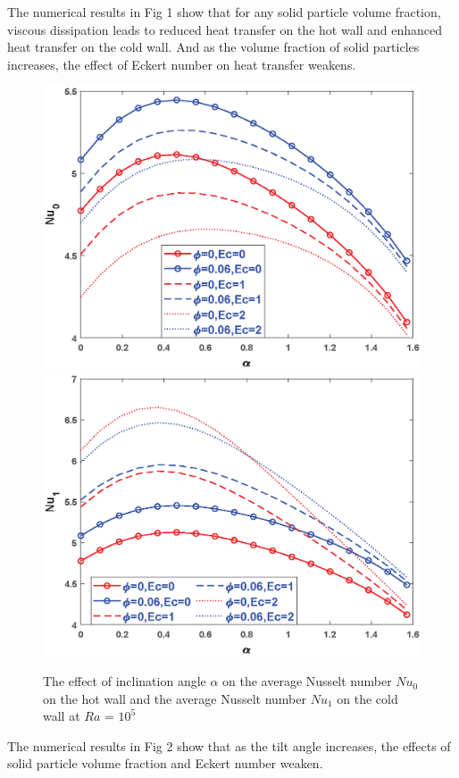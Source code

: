 \documentclass[12pt]{llncs}
\begin{document}
The numerical results in Fig 1 show that for any solid particle volume fraction, viscous dissipation leads to reduced heat transfer on the hot wall and enhanced heat transfer on the cold wall. And as the volume fraction of solid particles increases, the effect of Eckert number on  heat transfer weakens.
\begin{figure}[htb]
 \centering
\vspace{-3.5cm}   
\setlength{\abovecaptionskip}{-3.cm}  
\includegraphics[width=0.48\linewidth]{3.eps} %
\includegraphics[width=0.48\linewidth]{4.eps} %
\caption{The effect of inclination angle $\alpha$ on the average Nusselt number $Nu_{0}$ on the hot wall and the average Nusselt number $Nu_{1}$ on the cold wall at $Ra$ = $10^{5}$}
%
\end{figure}
The numerical results in Fig 2 show that as the tilt angle increases, the effects of solid particle volume fraction and Eckert number weaken.
\end{document}
